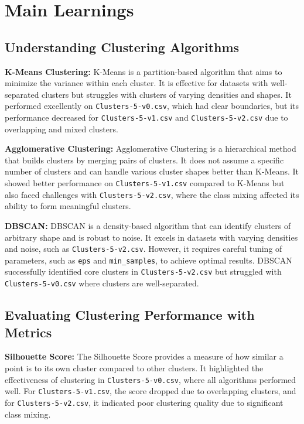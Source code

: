 \section*{Main Learnings}

\subsection*{Understanding Clustering Algorithms}

\textbf{K-Means Clustering:}
K-Means is a partition-based algorithm that aims to minimize the variance within each cluster. It is effective for datasets with well-separated clusters but struggles with clusters of varying densities and shapes. It performed excellently on \texttt{Clusters-5-v0.csv}, which had clear boundaries, but its performance decreased for \texttt{Clusters-5-v1.csv} and \texttt{Clusters-5-v2.csv} due to overlapping and mixed clusters.

\textbf{Agglomerative Clustering:}
Agglomerative Clustering is a hierarchical method that builds clusters by merging pairs of clusters. It does not assume a specific number of clusters and can handle various cluster shapes better than K-Means. It showed better performance on \texttt{Clusters-5-v1.csv} compared to K-Means but also faced challenges with \texttt{Clusters-5-v2.csv}, where the class mixing affected its ability to form meaningful clusters.

\textbf{DBSCAN:}
DBSCAN is a density-based algorithm that can identify clusters of arbitrary shape and is robust to noise. It excels in datasets with varying densities and noise, such as \texttt{Clusters-5-v2.csv}. However, it requires careful tuning of parameters, such as \texttt{eps} and \texttt{min\_samples}, to achieve optimal results. DBSCAN successfully identified core clusters in \texttt{Clusters-5-v2.csv} but struggled with \texttt{Clusters-5-v0.csv} where clusters are well-separated.

\subsection*{Evaluating Clustering Performance with Metrics}

\textbf{Silhouette Score:}
The Silhouette Score provides a measure of how similar a point is to its own cluster compared to other clusters. It highlighted the effectiveness of clustering in \texttt{Clusters-5-v0.csv}, where all algorithms performed well. For \texttt{Clusters-5-v1.csv}, the score dropped due to overlapping clusters, and for \texttt{Clusters-5-v2.csv}, it indicated poor clustering quality due to significant class mixing.

